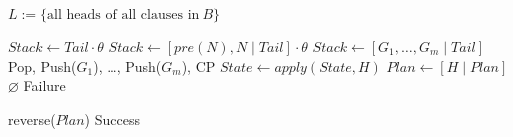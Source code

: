 \begin{algorithmic}\small

        \State $L :=  \{ \text{all heads of all clauses in} ~ B \}$

        \State

         
                \State $Stack \leftarrow Tail \cdot \theta$ 
             
                \State $Stack \leftarrow [pre(N), N \mid Tail] \cdot \theta$  
                \State $Stack \leftarrow [G_1, \ldots, G_m \mid Tail]$ \Comment Pop, Push($G_1$), \ldots, Push($G_m$), \alert{CP}
                \State $State \leftarrow apply(State, H)$
                \State $Plan \leftarrow [H \mid Plan]$
            \Else
                \State \Return $\varnothing$ \Comment Failure
            \EndIf
        \EndWhile

        \State

        \State \Return reverse($Plan$) \Comment Success
    \EndFunction
\end{algorithmic}